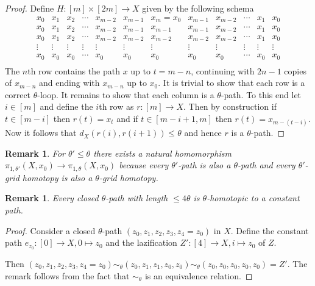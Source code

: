 \documentclass[a4paper, 11pt, twoside]{article}
\theoremstyle{break}
\theoremstyle{break}
\newtheorem{rem}[thm]{Remark}
\begin{document}
\begin{proof}
  Define $H\colon [m] \times [2m] \to X$ given by the following schema
  \begin{equation*}
    \begin{matrix}
      x_0 & x_1 & x_2 & \cdots & x_{m-2} & x_{m-1} & x_m = x_0 & x_{m-1} & x_{m-2} & \cdots & x_1 & x_0 \\
      x_0 & x_1 & x_2 & \cdots & x_{m-2} & x_{m-1} & x_{m-1} & x_{m-1} & x_{m-2} & \cdots & x_1 & x_0 \\
      x_0 & x_1 & x_2 & \cdots & x_{m-2} & x_{m-2} & x_{m-2} & x_{m-2} & x_{m-2} & \cdots & x_1 & x_0 \\
      \vdots & \vdots & \vdots & \vdots & \vdots & \vdots & \vdots & \vdots & \vdots & \vdots & \vdots & \vdots \\
      x_0 & x_0 & x_0 & \cdots & x_0 & x_0 & x_0 & x_0 & x_0 & \cdots & x_0 & x_0 \\
    \end{matrix}
  \end{equation*}
  The $n$th row contains the path $x$ up to $t = m-n$, continuing with $2n-1$ copies of $x_{m-n}$ and ending with $x_{m-n}$ up to $x_0$.
  It is trivial to show that each row is a correct $\theta$-loop. It remains to show that each column is a $\theta$-path. To this end let $i \in [m]$ and define the $i$th row as $r\colon [m] \to X$.
  Then by construction if $t \in [m-i]$ then $r(t) = x_t$ and if $t \in [m-i+1, m]$ then $r(t) = x_{m-(t-i)}$. 
  Now it follows that $d_X(r(i), r(i+1)) \leq \theta$ and hence $r$ is a $\theta$-path.
\end{proof}

\begin{rem}
  For $\theta' \leq \theta$ there exists a natural homomorphism $\pi_{1,\theta'}(X, x_0) \to \pi_{1,\theta}(X, x_0)$ 
  because every $\theta'$-path is also a $\theta$-path and every $\theta'$-grid homotopy is also a $\theta$-grid homotopy.
\end{rem}

\begin{rem}
  Every closed $\theta$-path with length $\leq 4\theta$ is $\theta$-homotopic to a constant path.

  \cite[p. 4]{vigolo2018fundamental}
\end{rem}

\begin{proof}
  Consider a closed $\theta$-path $(z_0, z_1, z_2, z_3, z_4 = z_0)$ in $X$. 
  Define the constant path $e_{z_0}\colon [0] \to X, 0 \mapsto z_0$ and the lazification $Z': [4] \to X, i \mapsto z_0$ of $Z$.

  Then $(z_0, z_1, z_2, z_3, z_4 = z_0) \sim_{\theta} (z_0, z_1, z_1, z_0, z_0)\sim_{\theta} (z_0, z_0, z_0, z_0, z_0) = Z'$. The remark follows from the fact that $\sim_{\theta}$ is an equivalence relation.
\end{proof}
\end{document}
